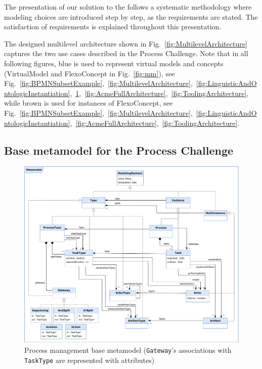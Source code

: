 
The presentation of our solution to the \mlpc follows a systematic methodology
where modeling choices are introduced step by step, as the requirements are
stated. The satisfaction of requirements is explained throughout this
presentation.


The designed multilevel architecture shown in
Fig.~\ref{fig:MultilevelArchitecture} captures the two use cases described in
the Process Challenge.
Note that in all following figures, blue is used to represent \FML virtual
models and concepts (\textsf{VirtualModel} and \textsf{FlexoConcept} in
Fig.~\ref{fig:mm}), see
Fig.~\ref{fig:BPMNSubsetExample},~\ref{fig:MultilevelArchitecture},~\ref{fig:LinguisticAndOntologicInstantiation},~\ref{fig:BaseMetamodel},~\ref{fig:AcmeFullArchitecture},~\ref{fig:ToolingArchitecture},
while brown is used for instances of \textsf{FlexoConcept}, see
Fig.~\ref{fig:BPMNSubsetExample},~\ref{fig:MultilevelArchitecture},~\ref{fig:LinguisticAndOntologicInstantiation},~\ref{fig:AcmeFullArchitecture},~\ref{fig:ToolingArchitecture}.

\subsection{Base metamodel for the Process Challenge}

\begin{figure}
 \centering
    \includegraphics[width=1.0 \textwidth]{Figures/Metamodel-1.5.pdf}
     \caption{Process management base metamodel (\texttt{Gateway}'s associations with \texttt{TaskType} are represented with attributes)}
    \label{fig:BaseMetamodel}
\end{figure}

